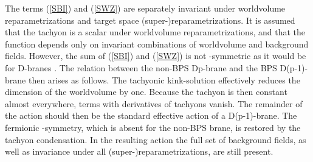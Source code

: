 \documentclass[12pt,a4paper]{article}
\begin{document}
The terms (\ref{SBI})
 and (\ref{SWZ}) are separately invariant
 under worldvolume reparametrizations and target space
 (super-)reparametrizations.
 It is assumed that the tachyon is a scalar under worldvolume
 reparametrizations, and that the function \coordHE{} depends only on
 invariant combinations of worldvolume and background fields.
 However, the sum of (\ref{SBI}) and (\ref{SWZ}) is not \myHighlight{$\kappa$}\coordHE{}-symmetric
 as it would be for D-branes \cite{Aga,Ced,BT}. The relation between
 the non-BPS Dp-brane and the BPS D(p-1)-brane then arises as follows.
 The tachyonic kink-solution effectively reduces the dimension of the
 worldvolume by one. Because the tachyon is then constant almost everywhere,
 terms with derivatives of tachyons vanish. The remainder of the action
 should then be the standard effective action of a D(p-1)-brane.
 The fermionic \myHighlight{$\kappa$}\coordHE{}-symmetry, which is absent for the non-BPS
 brane, is restored by the tachyon condensation.
 In the resulting action the full set of background fields, as well as
 invariance under all (super-)reparametrizations, are still present.
\end{document}
